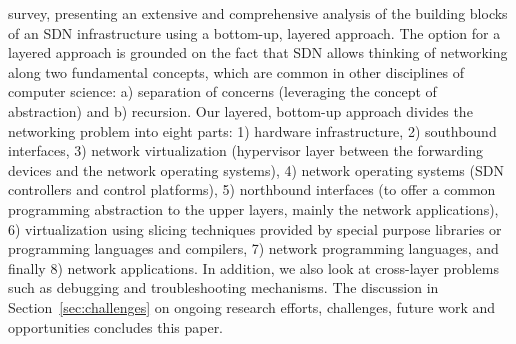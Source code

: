 survey, presenting an extensive and comprehensive
analysis of the building blocks of an SDN infrastructure using a
bottom-up, layered approach.  The option for a layered approach is
grounded on the fact that SDN allows thinking of networking along two
fundamental concepts, which are common in other disciplines of 
computer science: a) separation of concerns (leveraging the concept of abstraction) and b) recursion.
Our layered, bottom-up approach divides the networking problem into eight parts: 1) hardware infrastructure, 2) southbound interfaces, 3) network virtualization (hypervisor layer between 
the forwarding devices and the network operating systems), 4) network operating 
systems (SDN controllers and control platforms), 5) northbound interfaces 
(to offer a common programming abstraction to the upper layers, mainly the network applications), 6) virtualization using slicing techniques provided by special purpose 
libraries or programming languages and compilers, 7) network 
programming languages, and finally 8) network applications. In addition, 
we also look at cross-layer problems such as debugging and troubleshooting 
mechanisms. The discussion in Section~\ref{sec:challenges} on ongoing research efforts, challenges, future work and opportunities concludes this paper.

